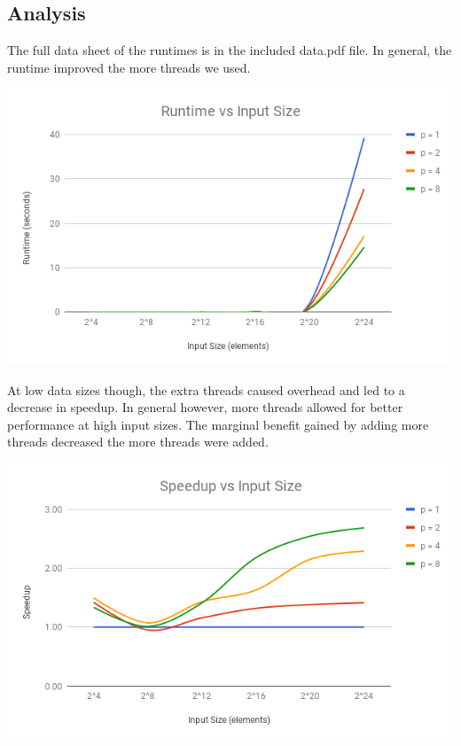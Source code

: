 \documentclass{math}
\begin{document}
\subsection*{Analysis}
The full data sheet of the runtimes is in the included data.pdf file.
In general, the runtime improved the more threads we used.
\begin{center}
  \includegraphics[width=16cm]{assets/project2_runtime.png}
\end{center}
At low data sizes though, the extra threads caused overhead and led to a
decrease in speedup. In general however, more threads allowed for better
performance at high input sizes. The marginal benefit gained by adding
more threads decreased the more threads were added.
\begin{center}
  \includegraphics[width=16cm]{assets/project2_speedup.png}
\end{center}
\end{document}
